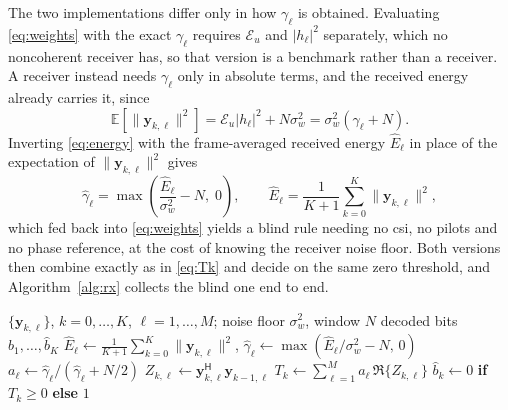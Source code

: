 \documentclass[12pt, draftclsnofoot, onecolumn]{IEEEtran}
\newcommand{\Real}{\mathfrak{R}}
\newcommand{\Eu}{\mathcal{E}_u}
\newenvironment{revblock}{}{}
\begin{document}
\begin{revblock}
The two implementations differ only in how $\gamma_\ell$ is obtained.
Evaluating \eqref{eq:weights} with the exact $\gamma_\ell$ requires $\Eu$ and
$|h_\ell|^2$ separately, which no noncoherent receiver has, so that version is a
benchmark rather than a receiver. A receiver instead needs $\gamma_\ell$ only in
absolute terms, and the received energy already carries it, since
\begin{equation}
\mathbb{E}\!\left[\|\mathbf{y}_{k,\ell}\|^2\right]
= \Eu|h_\ell|^2 + N\sigma_w^2
= \sigma_w^2\left(\gamma_\ell + N\right).
\label{eq:energy}
\end{equation}
Inverting \eqref{eq:energy} with the frame-averaged received energy
$\hat{E}_\ell$ in place of the expectation of $\|\mathbf{y}_{k,\ell}\|^2$ gives
\begin{equation}
\hat\gamma_\ell=\max\!\left(\frac{\hat{E}_\ell}{\sigma_w^2}-N,\;0\right),
\qquad
\hat{E}_\ell=\frac{1}{K+1}\sum_{k=0}^{K}\|\mathbf{y}_{k,\ell}\|^2 ,
\label{eq:gammahat}
\end{equation}
which fed back into \eqref{eq:weights} yields a blind rule needing no \ac{csi}, no
pilots and no phase reference, at the cost of knowing the receiver noise
floor. Both versions then
combine exactly as in \eqref{eq:Tk} and decide on the same zero threshold, and
Algorithm~\ref{alg:rx} collects the blind one end to end.
\end{revblock}

\begin{algorithm}[!t]
\caption{\Ac{simo}-\ac{dbn} reception of one frame}
\label{alg:rx}
\small
\begin{algorithmic}[1]
\Require $\{\mathbf{y}_{k,\ell}\}$, $k=0,\dots,K$, $\ell=1,\dots,M$;
         noise floor $\sigma_w^2$, window $N$
\Ensure decoded bits $\hat{b}_1,\dots,\hat{b}_K$
  \State $\hat{E}_\ell \gets \frac{1}{K+1}\sum_{k=0}^{K}\|\mathbf{y}_{k,\ell}\|^{2}$,\quad
         $\hat\gamma_\ell \gets \max(\hat{E}_\ell/\sigma_w^2-N,\,0)$
         \Comment{\eqref{eq:gammahat}}
  \State $a_\ell \gets \hat\gamma_\ell/(\hat\gamma_\ell+N/2)$
\EndFor
{}
    \State $Z_{k,\ell} \gets \mathbf{y}_{k,\ell}^{\mathsf{H}}\mathbf{y}_{k-1,\ell}$
  \EndFor
  \State $T_k \gets \sum_{\ell=1}^{M} a_\ell\,\Real\{Z_{k,\ell}\}$
         \Comment{\eqref{eq:Tk}}
  \State $\hat{b}_k \gets 0$ \textbf{if} $T_k\geq0$ \textbf{else} $1$
\EndFor
\end{algorithmic}
\end{algorithm}
\end{document}
